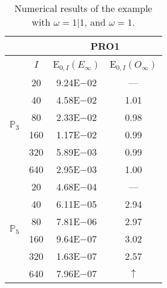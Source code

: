 \begin{table}[H]
\caption{Numerical results of the example with $\omega=1|1$, and $\omega=1$.}
\setlength{\tabcolsep}{5pt}
\centering
\begin{tabular}{@{}l c c c@{}}
\toprule
 &  & \multicolumn{2}{c}{PRO1}\\
\midrule
 & $I$ & E$_{0,I}(E_{\infty})$ & E$_{0,I}(O_{\infty})$\\
\midrule
\multirow{6}{*}{$\mathbb{P}_{3}$}
 & 20 & 9.24E$-$02 & ---\\
 & 40 & 4.58E$-$02 & 1.01\\
 & 80 & 2.33E$-$02 & 0.98\\
 & 160 & 1.17E$-$02 & 0.99\\
 & 320 & 5.89E$-$03 & 0.99\\
 & 640 & 2.95E$-$03 & 1.00\\
\midrule
\multirow{6}{*}{$\mathbb{P}_{5}$}
 & 20 & 4.68E$-$04 & ---\\
 & 40 & 6.11E$-$05 & 2.94\\
 & 80 & 7.81E$-$06 & 2.97\\
 & 160 & 9.64E$-$07 & 3.02\\
 & 320 & 1.63E$-$07 & 2.57\\
 & 640 & 7.96E$-$07 & $\uparrow$\\
\bottomrule
\end{tabular}
\label{Table:PRO:test_01_01_test40_pro1}
\end{table}
